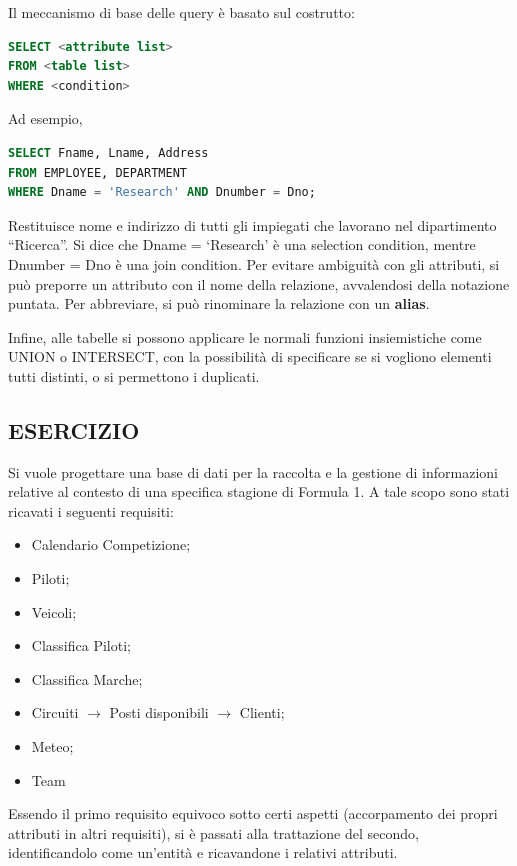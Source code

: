 Il meccanismo di base delle query è basato sul costrutto: 

\begin{lstlisting}[language=SQL]
SELECT <attribute list>
FROM <table list>
WHERE <condition> 
\end{lstlisting}

Ad esempio,

\begin{lstlisting}[language=SQL]
SELECT Fname, Lname, Address
FROM EMPLOYEE, DEPARTMENT
WHERE Dname = 'Research' AND Dnumber = Dno; 
\end{lstlisting}

Restituisce nome e indirizzo di tutti gli impiegati che lavorano nel dipartimento “Ricerca”. Si dice che Dname = ‘Research’ è una selection condition, mentre Dnumber = Dno è una join condition. Per evitare ambiguità con gli attributi, si può preporre un attributo con il nome della relazione, avvalendosi della notazione puntata. Per abbreviare, si può rinominare la relazione con un \textbf{alias}.
  
Infine, alle tabelle si possono applicare le normali funzioni insiemistiche come UNION o INTERSECT, con la possibilità di specificare se si vogliono elementi tutti distinti, o si permettono i duplicati.   


\subsection{ESERCIZIO}

Si vuole progettare una base di dati per la raccolta e la gestione di informazioni relative al contesto di una specifica stagione di Formula 1. A tale scopo sono stati ricavati i seguenti requisiti:

\begin{itemize}

\item Calendario Competizione;
\item Piloti;
\item Veicoli;
\item Classifica Piloti;
\item Classifica Marche;
\item Circuiti $\rightarrow$ Posti disponibili $\rightarrow$ Clienti;
\item Meteo;
\item Team  

\end{itemize}

Essendo il primo requisito equivoco sotto certi aspetti (accorpamento dei propri attributi in altri requisiti), si è passati alla trattazione del secondo, identificandolo come un’entità e ricavandone i relativi attributi. 

